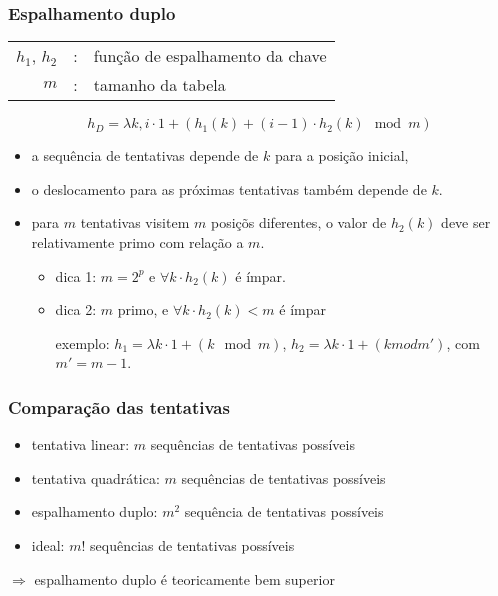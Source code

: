 \documentclass{beamer}
\begin{document}
\begin{frame}

\frametitle{Espalhamento duplo}

\begin{tabular}{rcl}
$h_1$, $h_2$ & : & função de espalhamento da chave \\
$m$ & : & tamanho da tabela
\end{tabular}

$$h_D = \lambda k, i \cdot 1 + (h_1(k) + (i-1)\cdot h_2(k) \mod m)$$

\begin{itemize}
\item a sequência de tentativas depende de $k$ para a posição inicial, 

\item o deslocamento para as próximas tentativas também depende de $k$.

\item para $m$ tentativas visitem $m$ posiçõs diferentes,
  o valor de $h_2(k)$ deve ser relativamente primo com relação a $m$.

\begin{itemize}

\item dica 1: $m = 2^p$ e $\forall k \cdot h_2(k)$ é ímpar.

\item dica 2: $m$ primo, e $\forall k \cdot h_2(k) < m$ é ímpar

  exemplo: $h_1 = \lambda k \cdot 1 + (k \mod m)$, $h_2 = \lambda k \cdot 1 + (k mod m')$,
  com $m' = m - 1$.

\end{itemize}

\end{itemize}

\end{frame}

\begin{frame}

\frametitle{Comparação das tentativas}

\begin{itemize}

\item tentativa linear: $m$ sequências de tentativas possíveis

\item tentativa quadrática: $m$ sequências de tentativas possíveis

\item espalhamento duplo: $m^2$ sequência de tentativas possíveis

\item ideal: $m!$ sequências de tentativas possíveis

\end{itemize}

\alert{$\Longrightarrow$} espalhamento duplo é teoricamente bem superior

\end{frame}
\end{document}
